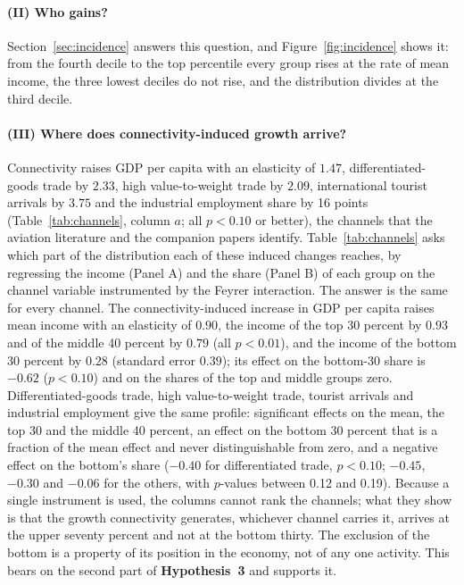 

\paragraph{(II) Who gains?}
Section~\ref{sec:incidence} answers this question, and Figure~\ref{fig:incidence} shows it: from the fourth decile to the top percentile every group rises at the rate of mean income, the three lowest deciles do not rise, and the distribution divides at the third decile.

\paragraph{(III) Where does connectivity-induced growth arrive?}
Connectivity raises GDP per capita with an elasticity of $1.47$, differentiated-goods trade by $2.33$, high value-to-weight trade by $2.09$, international tourist arrivals by $3.75$ and the industrial employment share by 16 points (Table~\ref{tab:channels}, column $a$; all $p<0.10$ or better), the channels that the aviation literature and the companion papers identify. Table~\ref{tab:channels} asks which part of the distribution each of these induced changes reaches, by regressing the income (Panel A) and the share (Panel B) of each group on the channel variable instrumented by the Feyrer interaction. The answer is the same for every channel. The connectivity-induced increase in GDP per capita raises mean income with an elasticity of $0.90$, the income of the top 30 percent by $0.93$ and of the middle 40 percent by $0.79$ (all $p<0.01$), and the income of the bottom 30 percent by $0.28$ (standard error $0.39$); its effect on the bottom-30 share is $-0.62$ ($p<0.10$) and on the shares of the top and middle groups zero. Differentiated-goods trade, high value-to-weight trade, tourist arrivals and industrial employment give the same profile: significant effects on the mean, the top 30 and the middle 40 percent, an effect on the bottom 30 percent that is a fraction of the mean effect and never distinguishable from zero, and a negative effect on the bottom's share ($-0.40$ for differentiated trade, $p<0.10$; $-0.45$, $-0.30$ and $-0.06$ for the others, with $p$-values between 0.12 and 0.19). Because a single instrument is used, the columns cannot rank the channels; what they show is that the growth connectivity generates, whichever channel carries it, arrives at the upper seventy percent and not at the bottom thirty. The exclusion of the bottom is a property of its position in the economy, not of any one activity. This bears on the second part of \textbf{Hypothesis~3} and supports it.

